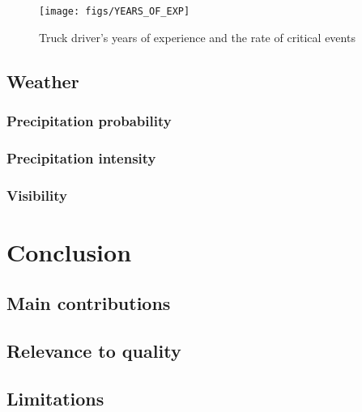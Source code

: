 \documentclass[]{elsarticle} %
\begin{document}
\begin{figure}[!hb]

{\centering \texttt{[image: figs/YEARS\_OF\_EXP]} 

}

\caption{Truck driver's years of experience and the rate of critical events}\label{fig:unnamed-chunk-5}
\end{figure}

\hypertarget{weather}{%
\subsection{Weather}\label{weather}}

\hypertarget{precipitation-probability}{%
\subsubsection{Precipitation probability}\label{precipitation-probability}}

\hypertarget{precipitation-intensity}{%
\subsubsection{Precipitation intensity}\label{precipitation-intensity}}

\hypertarget{visibility}{%
\subsubsection{Visibility}\label{visibility}}

\hypertarget{conclusion}{%
\section{Conclusion}\label{conclusion}}

\hypertarget{main-contributions}{%
\subsection{Main contributions}\label{main-contributions}}

\hypertarget{relevance-to-quality}{%
\subsection{Relevance to quality}\label{relevance-to-quality}}

\hypertarget{limitations}{%
\subsection{Limitations}\label{limitations}}
\end{document}
